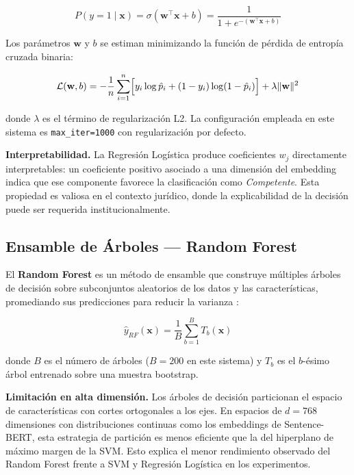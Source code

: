 \begin{equation}
  P(y = 1 \mid \mathbf{x})
  = \sigma(\mathbf{w}^\top \mathbf{x} + b)
  = \frac{1}{1 + e^{-(\mathbf{w}^\top \mathbf{x} + b)}}
  \label{eq:logistica}
\end{equation}

Los parámetros $\mathbf{w}$ y $b$ se estiman minimizando la función de pérdida
de entropía cruzada binaria:

\begin{equation}
  \mathcal{L}(\mathbf{w}, b)
  = -\frac{1}{n} \sum_{i=1}^n
    \Bigl[y_i \log \hat{p}_i + (1 - y_i) \log(1 - \hat{p}_i)\Bigr]
  + \lambda \|\mathbf{w}\|^2
  \label{eq:cross-entropy}
\end{equation}

donde $\lambda$ es el término de regularización L2. La configuración empleada
en este sistema es \texttt{max\_iter=1000} con regularización por defecto.

\noindent\textbf{Interpretabilidad.} La Regresión Logística produce coeficientes
$w_j$ directamente interpretables: un coeficiente positivo asociado a una
dimensión del embedding indica que ese componente favorece la clasificación como
\textit{Competente}. Esta propiedad es valiosa en el contexto jurídico, donde
la explicabilidad de la decisión puede ser requerida institucionalmente.

\subsection{Ensamble de Árboles — Random Forest}

El \textbf{Random Forest} es un método de ensamble que construye múltiples
árboles de decisión sobre subconjuntos aleatorios de los datos y las
características, promediando sus predicciones para reducir la varianza
\cite{breiman2001}:

\begin{equation}
  \hat{y}_{RF}(\mathbf{x})
  = \frac{1}{B} \sum_{b=1}^{B} T_b(\mathbf{x})
  \label{eq:rf}
\end{equation}

donde $B$ es el número de árboles ($B = 200$ en este sistema) y $T_b$ es el
$b$-ésimo árbol entrenado sobre una muestra bootstrap.

\noindent\textbf{Limitación en alta dimensión.} Los árboles de decisión
particionan el espacio de características con cortes ortogonales a los ejes.
En espacios de $d = 768$ dimensiones con distribuciones continuas como los
embeddings de Sentence-BERT, esta estrategia de partición es menos eficiente
que la del hiperplano de máximo margen de la SVM. Esto explica el menor
rendimiento observado del Random Forest frente a SVM y Regresión Logística en
los experimentos.

